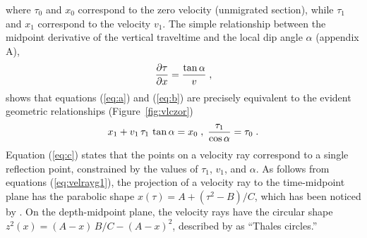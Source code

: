where $\tau_0$ and $x_0$ correspond to the zero velocity (unmigrated
section), while $\tau_1$ and $x_1$ correspond to the velocity $v_1$.
The
simple relationship between the midpoint derivative of the vertical
traveltime and the local dip angle $\alpha$ (appendix A),
\begin{equation}
{{\partial \tau} \over {\partial x}} = 
{{\tan{\alpha}} \over v}\;,
\label{eq:dtaudx} 
\end{equation}
shows that equations (\ref{eq:a}) and (\ref{eq:b}) are precisely equivalent
to the evident geometric relationships (Figure~\ref{fig:vlczor})
\begin{equation}
x_1 + v_1\,\tau_1\,\tan{\alpha} = x_0\;,
\;{\tau_1 \over {\cos{\alpha}}} = \tau_0\;.
\label{eq:evident}
\end{equation}
Equation (\ref{eq:c}) states that the points on a velocity ray correspond
to a single reflection point, constrained by the values of $\tau_1$,
$v_1$, and $\alpha$.  As follows from equations (\ref{eq:velrayg1}), the
projection of a velocity ray to the time-midpoint plane has the
parabolic shape $x(\tau) = A + (\tau^2 - B) / C$, which has been
noticed by \cite{GEO46.05.07170733}. On the depth-midpoint plane, the
velocity rays have the circular shape $z^2(x) = (A - x)\,B / C - (A -
x)^2$, described by \cite{them} as ``Thales circles.''



